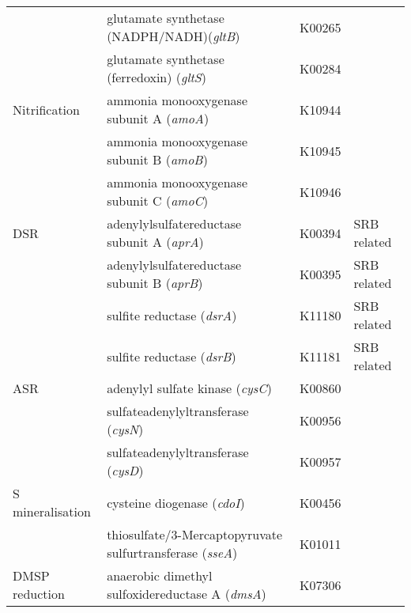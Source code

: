 \begin{longtable}{p{2.7cm}p{7.5cm}p{1cm}p{1.8cm}}
 & glutamate synthetase (NADPH/NADH)(\emph{gltB}) & K00265 &  \\
 & glutamate synthetase (ferredoxin) (\emph{gltS}) & K00284 &  \\
Nitrification & ammonia monooxygenase subunit A (\emph{amoA}) & K10944 &  \\
 & ammonia monooxygenase subunit B (\emph{amoB}) & K10945 &  \\
 & ammonia monooxygenase subunit C (\emph{amoC}) & K10946 &  \\
DSR & adenylylsulfatereductase subunit A (\emph{aprA}) & K00394 & SRB related \\
 & adenylylsulfatereductase subunit B (\emph{aprB}) & K00395 & SRB related \\
 & sulfite reductase (\emph{dsrA}) & K11180 & SRB related \\
 & sulfite reductase (\emph{dsrB}) & K11181 & SRB related \\
ASR & adenylyl sulfate kinase (\emph{cysC}) & K00860 &  \\
 & sulfateadenylyltransferase (\emph{cysN}) & K00956 &  \\
 & sulfateadenylyltransferase (\emph{cysD}) & K00957 &  \\
S mineralisation & cysteine diogenase (\emph{cdoI}) & K00456 &  \\
 & thiosulfate/3-Mercaptopyruvate sulfurtransferase (\emph{sseA}) & K01011 &  \\
DMSP reduction & anaerobic dimethyl sulfoxidereductase A (\emph{dmsA}) & K07306 &  \\
\end{longtable}
\endgroup

